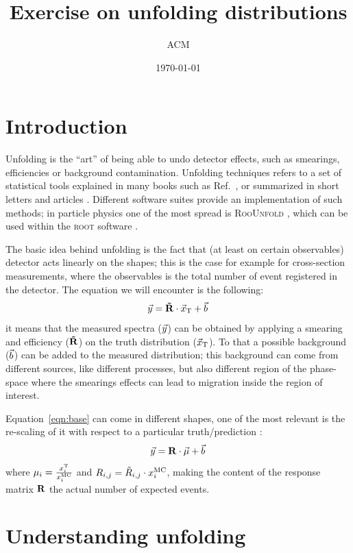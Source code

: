 \documentclass[a4paper,11pt]{article}
\title{Exercise on unfolding distributions}
\author{ACM}
\date{\today}
\begin{document}
\maketitle

\section*{Introduction}
Unfolding is the ``art'' of being able to undo detector effects, such as smearings, efficiencies or background contamination.
Unfolding techniques refers to a set of statistical tools explained in many books such as Ref.~\cite{Cowan}, 
or summarized in short letters and articles \cite{Cowan:unfolding}. 
Different software suites provide an implementation of such methods; 
in particle physics one of the most spread is {\scshape RooUnfold} \cite{RooUnfold}, 
which can be used within the {\scshape root} software \cite{ROOT}. 

The basic idea behind unfolding is the fact that (at least on certain observables) detector acts linearly on the shapes; this is the case for example for cross-section measurements, where the observables is the total number of event registered in the detector.
The equation we will encounter is the following:
\begin{equation}
	\vec{y}= \mathbf{\tilde{R}} \cdot \vec{x}_\textup{T} + \vec{b}
	\label{eqn:base}
\end{equation}
it means that the measured spectra ($\vec{y}$) can be obtained by applying a smearing and efficiency ($\mathbf{\tilde{R}}$) on the truth distribution ($\vec{x}_\textup{T}$). To that a possible background ($\vec{b}$) can be added to the measured distribution; this background can come from different sources, like different processes, but also different region of the phase-space where the smearings effects can lead to migration inside the region of interest.

Equation~\ref{eqn:base} can come in different shapes, one of the most relevant is the re-scaling of it with respect to a particular truth/prediction \cite{SVD}:
\begin{equation}
	\vec{y} = \mathbf{R} \cdot \vec{\mu} + \vec{b}
\end{equation}
where $\mu_{i} = \frac{x^\textup{T}_{i}}{x^\textup{MC}_{i}} $ and  $R_{i,j} = \tilde{R}_{i,j} \cdot x^\textup{MC}_{i} $, making the content of the response matrix $\mathbf{R}$ the actual number of expected events.

\section{Understanding unfolding}
\end{document}
